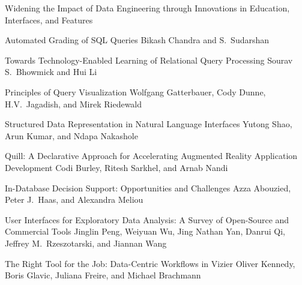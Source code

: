 \documentclass[11pt]{article}
\begin{document}
\begin{bulletin}
\begin{articlesection}{Widening the Impact of Data Engineering through Innovations in Education, Interfaces, and Features}

\begin{article}
{Automated Grading of SQL Queries}
{Bikash Chandra and S.\ Sudarshan}

\end{article}

\begin{article}
{Towards Technology-Enabled Learning of Relational Query Processing}
{Sourav S.\ Bhowmick and Hui Li}

\end{article}

\begin{article}
{Principles of Query Visualization}
{Wolfgang Gatterbauer, Cody Dunne, H.V.\ Jagadish, and Mirek Riedewald}

\end{article}

\begin{article}
{Structured Data Representation in Natural Language Interfaces}
{Yutong Shao, Arun Kumar, and Ndapa Nakashole}

\end{article}

\begin{article}
{Quill: A Declarative Approach for Accelerating Augmented Reality Application Development}
{Codi Burley, Ritesh Sarkhel, and Arnab Nandi}

\end{article}

\begin{article}
{In-Database Decision Support: Opportunities and Challenges}
{Azza Abouzied, Peter J.\ Haas, and Alexandra Meliou}

\end{article}

\begin{article}
{User Interfaces for Exploratory Data Analysis: A Survey of Open-Source and Commercial Tools}
{Jinglin Peng, Weiyuan Wu, Jing Nathan Yan, Danrui Qi, Jeffrey M.\ Rzeszotarski, and Jiannan Wang}

\end{article}

\begin{article}
{The Right Tool for the Job: Data-Centric Workflows in Vizier}
{Oliver Kennedy, Boris Glavic, Juliana Freire, and Michael Brachmann}

\end{article}


\end{articlesection}
\end{bulletin}
\end{document}
